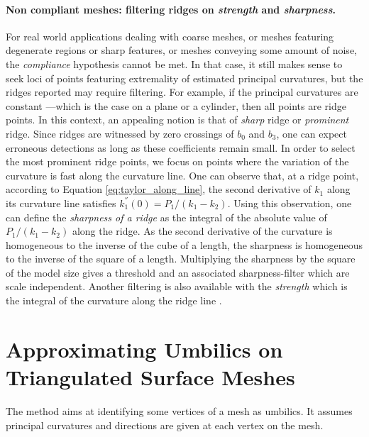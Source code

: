 \paragraph{Non compliant meshes: filtering ridges on {\em
strength} and {\em sharpness}.}
For real world applications dealing with coarse meshes, or meshes
featuring degenerate regions or sharp features, or meshes conveying
some amount of noise, the {\em compliance} hypothesis
\cite{cgal:cp-tdare-05} cannot be met. In that case, it still makes
sense to seek loci of points featuring extremality of estimated
principal curvatures, but the ridges reported may require
filtering. For example, if the principal curvatures are constant
---which is the case on a plane or a cylinder, then all points are
ridge points. In this context, an appealing notion is that of {\em
sharp} ridge or {\em prominent} ridge. Since ridges are witnessed by
zero crossings of $b_0$ and $b_3$, one can expect erroneous detections
as long as these coefficients remain small. In order to select the
most prominent ridge points, we focus on points where the variation of
the curvature is fast along the curvature line.  One can observe that,
at a ridge point, according to  Equation
\ref{eq:taylor_along_line}, the second derivative of $k_1$ along its
curvature line satisfies $k_1^{''}(0) = P_1/(k_1-k_2)$.  Using this
observation, one can define the {\em sharpness of a ridge} as the
integral of the absolute value of $P_1/(k_1-k_2)$ along the ridge. As
the second derivative of the curvature is homogeneous to the inverse
of the cube of a length, the sharpness is homogeneous to the inverse
of the square of a length. Multiplying the sharpness by the square of
the model size gives a threshold and an associated sharpness-filter
which are scale independent. Another filtering is also available with
the {\em strength } which is the integral of the curvature along the
ridge line
\cite{cgal:ybs-rvlmi-04}.





\section{Approximating Umbilics on Triangulated Surface Meshes}
\label{umbilic-mesh}

The method aims at identifying some vertices of a mesh as umbilics. It
assumes principal curvatures and directions are given at each vertex
on the mesh.
%

